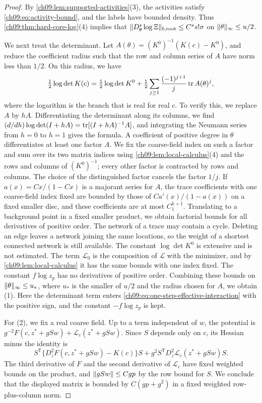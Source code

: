 \begin{proof}
By \cref{ch09:lem:supported-activities}(3), the activities satisfy \eqref{ch09:eq:activity-bound}, and the labels have bounded density. Thus \cref{ch09:thm:hard-core-log}(4) implies that $\lVert D_\theta^s\log\Xi\rVert_{b,\mathrm{root}}\le C^ss!\sigma$ on $\lVert \theta\rVert_\infty\le u/2$.

We next treat the determinant. Let $A(\theta)=(K^0)^{-1}(K(c)-K^0)$, and reduce the coefficient radius such that the row and column series of $A$ have norm less than $1/2$. On this radius, we have
\begin{equation}\label{ch09:eq:determinant-series}
 \tfrac12\log\det K(c)=\tfrac12\log\det K^0+\tfrac12\sum_{j\ge1}\frac{(-1)^{j+1}}j\operatorname{tr} A(\theta)^j,
\end{equation}
where the logarithm is the branch that is real for real $c$. To verify this, we replace $A$ by $hA$. Differentiating the determinant along its columns, we find $(d/dh)\log\det(I+hA)=\operatorname{tr}[(I+hA)^{-1}A]$, and integrating the Neumann series from $h=0$ to $h=1$ gives the formula. A coefficient of positive degree in $\theta$ differentiates at least one factor $A$. We fix the coarse-field index on such a factor and sum over its two matrix indices using \cref{ch09:lem:local-calculus}(4) and the rows and columns of $(K^0)^{-1}$; every other factor is contracted by rows and columns. The choice of the distinguished factor cancels the factor $1/j$. If $a(x)=Cx/(1-Cx)$ is a majorant series for $A$, the trace coefficients with one coarse-field index fixed are bounded by those of $Ca'(x)/(1-a(x))$ on a fixed smaller disc, and these coefficients are at most $C_1^{k+1}$. Translating to a background point in a fixed smaller product, we obtain factorial bounds for all derivatives of positive order. The network of a trace may contain a cycle. Deleting an edge leaves a network joining the same locations, so the weight of a shortest connected network is still available. The constant $\log\det K^0$ is extensive and is not estimated. The term $\mathcal L_0$ is the composition of $\mathcal L$ with the minimizer, and by \cref{ch09:lem:local-calculus} it has the same bounds with one index fixed. The constant $f\log z_p$ has no derivatives of positive order. Combining these bounds on $\lVert \theta\rVert_\infty\le u_*$, where $u_*$ is the smaller of $u/2$ and the radius chosen for $A$, we obtain (1). Here the determinant term enters \eqref{ch09:eq:one-step-effective-interaction} with the positive sign, and the constant $-f\log z_p$ is kept.

For (2), we fix a real coarse field. Up to a term independent of $w$, the potential is $g^{-2}F(c,z^*+gSw)+\mathcal L_c(z^*+gSw)$. Since $S$ depends only on $c$, its Hessian minus the identity is
\[
 S^{\mathsf T}\bigl\{D_z^2F(c,z^*+gSw)-K(c)\bigr\}S+g^2S^{\mathsf T}D_z^2\mathcal L_c(z^*+gSw)S.
\]
The third derivative of $F$ and the second derivative of $\mathcal L_c$ have fixed weighted bounds on the product, and $\lVert gSw\rVert\le Cgp$ by the row bound for $S$. We conclude that the displayed matrix is bounded by $C(gp+g^2)$ in a fixed weighted row-plus-column norm.
\end{proof}

